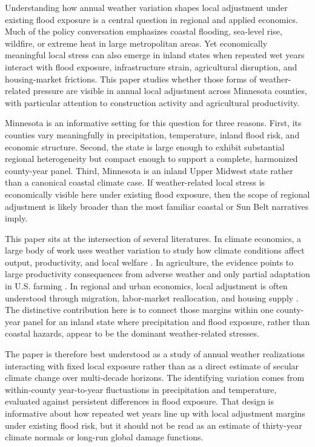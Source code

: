 \documentclass[12pt]{article}
\begin{document}
Understanding how annual weather variation shapes local adjustment under existing flood exposure is a central question in regional and applied economics. Much of the policy conversation emphasizes coastal flooding, sea-level rise, wildfire, or extreme heat in large metropolitan areas. Yet economically meaningful local stress can also emerge in inland states when repeated wet years interact with flood exposure, infrastructure strain, agricultural disruption, and housing-market frictions. This paper studies whether those forms of weather-related pressure are visible in annual local adjustment across Minnesota counties, with particular attention to construction activity and agricultural productivity.

Minnesota is an informative setting for this question for three reasons. First, its counties vary meaningfully in precipitation, temperature, inland flood risk, and economic structure. Second, the state is large enough to exhibit substantial regional heterogeneity but compact enough to support a complete, harmonized county-year panel. Third, Minnesota is an inland Upper Midwest state rather than a canonical coastal climate case. If weather-related local stress is economically visible here under existing flood exposure, then the scope of regional adjustment is likely broader than the most familiar coastal or Sun Belt narratives imply.

This paper sits at the intersection of several literatures. In climate economics, a large body of work uses weather variation to study how climate conditions affect output, productivity, and local welfare \citep{dell2014,hsiang2016,hsiang2017}. In agriculture, the evidence points to large productivity consequences from adverse weather and only partial adaptation in U.S. farming \citep{schlenker2009,burke2016}. In regional and urban economics, local adjustment is often understood through migration, labor-market reallocation, and housing supply \citep{blanchard1992,cattaneo2016,glaeser2005,saiz2010}. The distinctive contribution here is to connect those margins within one county-year panel for an inland state where precipitation and flood exposure, rather than coastal hazards, appear to be the dominant weather-related stresses.

The paper is therefore best understood as a study of annual weather realizations interacting with fixed local exposure rather than as a direct estimate of secular climate change over multi-decade horizons. The identifying variation comes from within-county year-to-year fluctuations in precipitation and temperature, evaluated against persistent differences in flood exposure. That design is informative about how repeated wet years line up with local adjustment margins under existing flood risk, but it should not be read as an estimate of thirty-year climate normals or long-run global damage functions.
\end{document}
